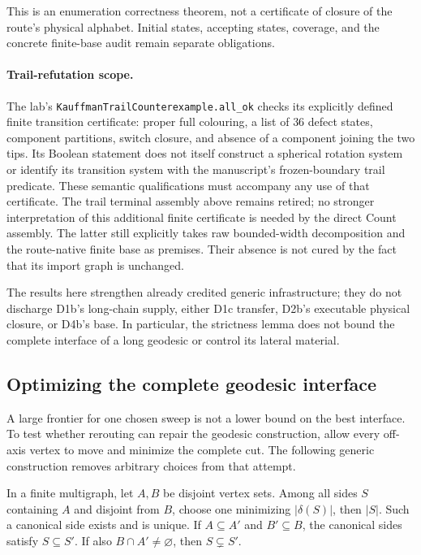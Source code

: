 This is an enumeration correctness theorem, not a certificate of closure of
the route's physical alphabet.  Initial states, accepting states, coverage,
and the concrete finite-base audit remain separate obligations.

\paragraph{Trail-refutation scope.}
The lab's \texttt{KauffmanTrailCounterexample.all\_ok} checks its explicitly
defined finite transition certificate: proper full colouring, a list of
$36$ defect states, component partitions, switch closure, and absence of a
component joining the two tips.  Its Boolean statement does not itself
construct a spherical rotation system or identify its transition system
with the manuscript's frozen-boundary trail predicate.  These semantic
qualifications must accompany any use of that certificate.  The trail
terminal assembly above remains retired; no stronger interpretation of this
additional finite certificate is needed by the direct Count assembly.
The latter still explicitly takes raw bounded-width decomposition and the
route-native finite base as premises.  Their absence is not cured by the
fact that its import graph is unchanged.

The results here
strengthen already credited generic infrastructure; they do not discharge
D1b's long-chain supply, either D1c transfer, D2b's executable physical
closure, or D4b's base.  In particular, the strictness lemma does not bound
the complete interface of a long geodesic or control its lateral material.

\subsection{Optimizing the complete geodesic interface}
\label{sec:canonical-geodesic-cuts}

A large frontier for one chosen sweep is not a lower bound on the best
interface.  To test whether rerouting can repair the geodesic construction,
allow every off-axis vertex to move and minimize the complete cut.  The
following generic construction removes arbitrary choices from that attempt.

\begin{theorem}
\label{thm:canonical-terminal-cuts}
In a finite multigraph, let $A,B$ be disjoint vertex sets.  Among all sides
$S$ containing $A$ and disjoint from $B$, choose one minimizing
$|\delta(S)|$, then $|S|$.  Such a canonical side exists and is unique.
If $A\subseteq A'$ and $B'\subseteq B$, the canonical sides satisfy
$S\subseteq S'$.  If also $B\cap A'\ne\varnothing$, then
$S\subsetneq S'$.
\end{theorem}

